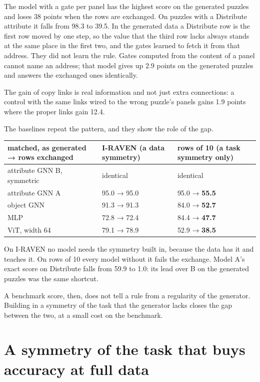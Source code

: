 The model with a gate per panel has the highest score on the generated puzzles and loses 38 points when the rows are exchanged. On puzzles with a Distribute attribute it falls from 98.3 to 39.5. In the generated data a Distribute row is the first row moved by one step, so the value that the third row lacks always stands at the same place in the first two, and the gates learned to fetch it from that address. They did not learn the rule. Gates computed from the content of a panel cannot name an address; that model gives up 2.9 points on the generated puzzles and answers the exchanged ones identically.

The gain of copy links is real information and not just extra connections: a control with the same links wired to the wrong puzzle's panels gains 1.9 points where the proper links gain 12.4.

The baselines repeat the pattern, and they show the role of the gap.

\begin{center}\small
\begin{tabularx}{\linewidth}{@{}YYY@{}}
\toprule
matched, as generated → rows exchanged & I-RAVEN (a data symmetry) & rows of 10 (a task symmetry only) \\
\midrule
attribute GNN B, symmetric & identical & identical \\
attribute GNN A & 95.0 → 95.0 & 95.0 → \textbf{55.5} \\
object GNN & 91.3 → 91.3 & 84.0 → \textbf{52.7} \\
MLP & 72.8 → 72.4 & 84.4 → \textbf{47.7} \\
ViT, width 64 & 79.1 → 78.9 & 52.9 → \textbf{38.5} \\
\bottomrule
\end{tabularx}
\end{center}

On I-RAVEN no model needs the symmetry built in, because the data has it and teaches it. On rows of 10 every model without it fails the exchange. Model A's exact score on Distribute falls from 59.9 to 1.0: its lead over B on the generated puzzles was the same shortcut.

A benchmark score, then, does not tell a rule from a regularity of the generator. Building in a symmetry of the task that the generator lacks closes the gap between the two, at a small cost on the benchmark.

\section{A symmetry of the task that buys accuracy at full data}\label{sec:6.6}

